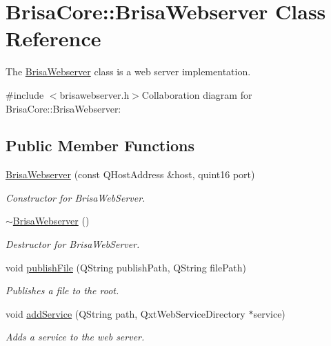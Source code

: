 \hypertarget{classBrisaCore_1_1BrisaWebserver}{
\section{BrisaCore::BrisaWebserver Class Reference}
\label{classBrisaCore_1_1BrisaWebserver}
}


The \hyperlink{classBrisaCore_1_1BrisaWebserver}{BrisaWebserver} class is a web server implementation.  


{\ttfamily \#include $<$brisawebserver.h$>$}Collaboration diagram for BrisaCore::BrisaWebserver:\subsection*{Public Member Functions}
\begin{DoxyCompactItemize}
\item 
\hyperlink{classBrisaCore_1_1BrisaWebserver_aee321e007a6eb0e338c2a74df3249cba}{BrisaWebserver} (const QHostAddress \&host, quint16 port)
\begin{DoxyCompactList}\small\item\em Constructor for BrisaWebServer. \item\end{DoxyCompactList}\item 
\hyperlink{classBrisaCore_1_1BrisaWebserver_afae61d5b3a9ec359b865229d2c974be4}{$\sim$BrisaWebserver} ()
\begin{DoxyCompactList}\small\item\em Destructor for BrisaWebServer. \item\end{DoxyCompactList}\item 
void \hyperlink{classBrisaCore_1_1BrisaWebserver_aaf83aae563ea7640d79a3d216b0ac93a}{publishFile} (QString publishPath, QString filePath)
\begin{DoxyCompactList}\small\item\em Publishes a file to the root. \item\end{DoxyCompactList}\item 
void \hyperlink{classBrisaCore_1_1BrisaWebserver_aec1ac4b58fa38f7099e7d67a8b09b8ba}{addService} (QString path, QxtWebServiceDirectory $\ast$service)
\begin{DoxyCompactList}\small\item\em Adds a service to the web server. \item\end{DoxyCompactList}\end{DoxyCompactItemize}

